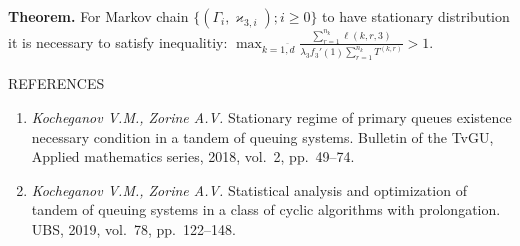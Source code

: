 \documentclass{article}
\begin{document}
{\bf Theorem. } For Markov chain ${\{(\Gamma_i, \varkappa_{3,i});  i \geqslant 0\}}$  to have stationary distribution it is necessary to satisfy inequalitiy:
$
\max_{k=\overline{1, d}} { \frac{\sum_{r = 1}^{n_{k}}\ell(k, r, 3)}{\lambda_3 f_3'(1) \sum_{r = 1}^{n_k} T^{(k, r)}} } >1.
$
 \begin{center}
 REFERENCES
 \end{center}
 
 \begin{enumerate}
\item {\it Kocheganov V.M., Zorine A.V.}
Stationary regime of primary queues existence necessary condition in a tandem of queuing systems. Bulletin of the TvGU, Applied mathematics series, 2018, vol.~2, pp.~49--74.
\item {\it Kocheganov V.M., Zorine A.V.}
Statistical analysis and optimization of tandem of queuing systems in a class of cyclic algorithms with prolongation. UBS, 2019, vol.~78, pp.~122--148.
 \end{enumerate}
\end{document}
